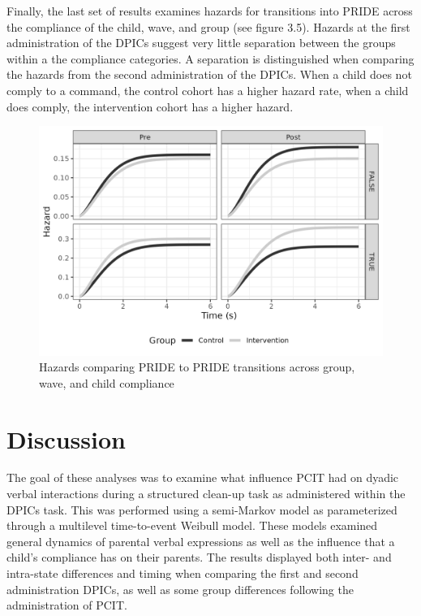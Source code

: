 \documentclass[12pt]{./styles/outhesis}
\begin{document}
Finally, the last set of results examines hazards for transitions into
PRIDE across the compliance of the child, wave, and group (see figure
3.5). Hazards at the first administration of the DPICs suggest very
little separation between the groups within a the compliance categories.
A separation is distinguished when comparing the hazards from the second
administration of the DPICs. When a child does not comply to a command,
the control cohort has a higher hazard rate, when a child does comply,
the intervention cohort has a higher hazard.

\begin{figure}
\centering
\includegraphics{figures/complyHazOnetoOne.png}
\caption{Hazards comparing PRIDE to PRIDE transitions across group,
wave, and child compliance}
\end{figure}

\newpage

\section{Discussion}
The goal of these analyses was to examine what influence PCIT had on
dyadic verbal interactions during a structured clean-up task as
administered within the DPICs task. This was performed using a
semi-Markov model as parameterized through a multilevel time-to-event
Weibull model. These models examined general dynamics of parental verbal
expressions as well as the influence that a child's compliance has on
their parents. The results displayed both inter- and intra-state
differences and timing when comparing the first and second
administration DPICs, as well as some group differences following the
administration of PCIT.
\end{document}
